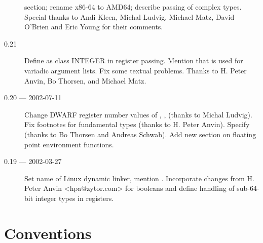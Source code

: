 \documentclass[12pt]{report}
\begin{document}
\begin{description}
  section; rename x86-64 to AMD64; describe passing of complex types.
  Special thanks to Andi Kleen, Michal Ludvig, Michael Matz, David
  O'Brien and Eric Young for their comments.
\item[0.21] Define  as class INTEGER in register
  passing.  Mention that  is used for variadic argument lists.  Fix
  some textual problems.  Thanks to H. Peter Anvin, Bo Thorsen, and
  Michael Matz.
\item[0.20 --- 2002-07-11] Change DWARF register number values of
  \RBX, \RSI, \RSI (thanks to Michal Ludvig).  Fix footnotes for
  fundamental types (thanks to H. Peter Anvin). Specify 
  (thanks to Bo Thorsen and Andreas Schwab).  Add new section on
  floating point environment functions.
\item[0.19 --- 2002-03-27] Set name of Linux dynamic linker, mention
  .
  Incorporate changes from H. Peter Anvin <hpa@zytor.com>
  for booleans and define handling of sub-64-bit integer types in
  registers.
\end{description}










\chapter{Conventions}



\appendix


\end{document}
